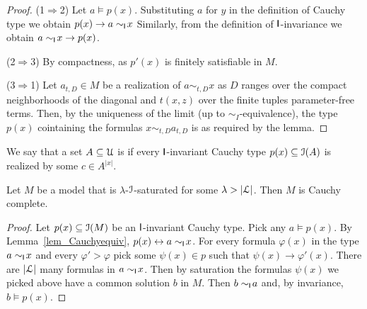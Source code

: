 \documentclass[10pt,oneside]{amsproc}
\renewcommand*{\emph}[1]{%
   \smash{\tikz[baseline]\node[rectangle, fill=teal!25, rounded corners, inner xsep=0.5ex, inner ysep=0.2ex, anchor=base, minimum height = 2.7ex]{\strut #1};}}
\begin{document}
\begin{proof}
  (1$\Rightarrow$2)
  Let $a\models p(x)$.
  Substituting $a$ for $y$ in the definition of Cauchy type we obtain $p(x)\rightarrow a\sim_{\sf I}\!x$
  Similarly, from the definition of ${\sf I}$-invariance we obtain $a\sim_{\sf I}\!x\rightarrow p(x)$.

  (2$\Rightarrow$3) 
  By compactness, as $p'(x)$ is finitely satisfiable in $M$.

  (3$\Rightarrow$1)  
  Let $a_{t,D}\in M$ be a realization of $a\sim_{t,D}x$ as $D$ ranges over the compact neighborhoods of the diagonal and $t(x,z)$ over the finite tuples parameter-free terms.
  Then, by the uniqueness of the limit (up to $\sim_I$-equivalence), the type $p(x)$ cointaining the formulas $x\sim_{t,D}a_{t,D}$ is as required by the lemma.
\end{proof}

We say that a set $A\subseteq{\EuScript U}$ is \emph{Cauchy complete\/} if every ${\sf I}$-invariant Cauchy type $p(x)\subseteq{\EuScript I}(A)$ is realized by some $c\in A^{|x|}$.


\begin{fact}
  Let $M$ be a model that is $\lambda$-${\EuScript I}$-saturated for some $\lambda>|{\EuScript L}|$.
  Then $M$ is Cauchy complete.
\end{fact}

\begin{proof}  
  Let $p(x)\subseteq{\EuScript I}(M)$ be an ${\sf I}$-invariant Cauchy type.
  Pick any $a\models p(x)$.
  By Lemma~\ref{lem_Cauchyequiv}, $p(x)\leftrightarrow a\sim_{\sf I}\!x$.
  For every formula $\varphi(x)$ in the type $a\sim_{\sf I}\!x$ and every $\varphi'>\varphi$ pick some $\psi(x)\in p$ such that $\psi(x)\rightarrow\varphi'(x)$.
  There are $|{\EuScript L}|$ many formulas in $a\sim_{\sf I}\!x$.
  Then by saturation the formulas $\psi(x)$ we picked above have a common solution $b$ in $M$.
  Then $b\sim_{\sf I}\!a$ and, by invariance, $b\models p(x)$.
\end{proof}
\end{document}
